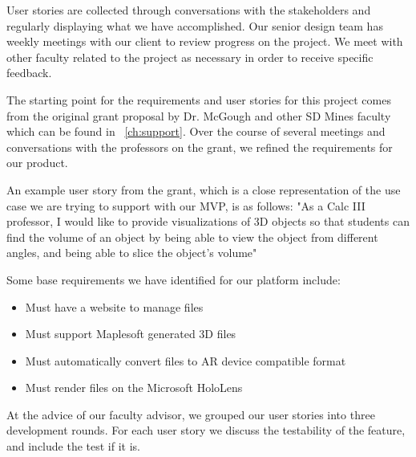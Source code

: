 User stories are collected through conversations with the stakeholders and
regularly displaying what we have accomplished. Our senior design team has
weekly meetings with our client to review progress on the project. We meet
with other faculty related to the project as necessary in order to receive
specific feedback.

The starting point for the requirements and user stories for this project comes
from the original grant proposal by Dr. McGough and other SD Mines faculty
which can be found in ~\autoref{ch:support}. Over the course of several
meetings and conversations with the professors on the grant, we refined the
requirements for our product.

An example user story from the grant, which is a close representation of the
use case we are trying to support with our MVP, is as follows: "As a Calc III
professor, I would like to provide visualizations of 3D objects so that
students can find the volume of an object by being able to view the object
from different angles, and being able to slice the object's volume"

Some base requirements we have identified for our platform include:
\begin{itemize}
	\item Must have a website to manage files
	\item Must support Maplesoft generated 3D files
	\item Must automatically convert files to AR device compatible format
	\item Must render files on the Microsoft HoloLens
\end{itemize}

At the advice of our faculty advisor, we grouped our user stories into three 
development rounds. For each user story we discuss the testability of the 
feature, and include the test if it is.



